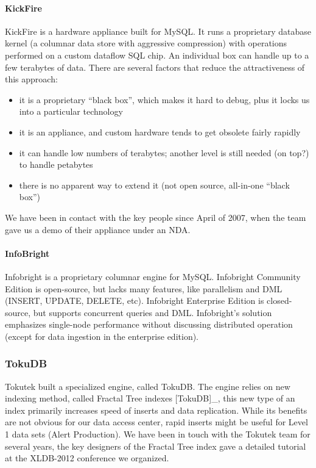 \documentclass[DM,lsstdraft,toc]{lsstdoc}
\begin{document}
\paragraph{KickFire}\label{kickfire}

KickFire is a hardware appliance built for MySQL. It runs a proprietary
database kernel (a columnar data store with aggressive compression) with
operations performed on a custom dataflow SQL chip. An individual box
can handle up to a few terabytes of data. There are several factors that
reduce the attractiveness of this approach:

\begin{itemize}
\item
  it is a proprietary ``black box'', which makes it hard to debug, plus
  it locks us into a particular technology
\item
  it is an appliance, and custom hardware tends to get obsolete fairly
  rapidly
\item
  it can handle low numbers of terabytes; another level is still needed
  (on top?) to handle petabytes
\item
  there is no apparent way to extend it (not open source, all-in-one
  ``black box'')
\end{itemize}

We have been in contact with the key people since April of 2007, when
the team gave us a demo of their appliance under an NDA.

\paragraph{InfoBright}\label{infobright}

Infobright is a proprietary columnar engine for MySQL. Infobright
Community Edition is open-source, but lacks many features, like
parallelism and DML (INSERT, UPDATE, DELETE, etc). Infobright Enterprise
Edition is closed-source, but supports concurrent queries and DML.
Infobright's solution emphasizes single-node performance without
discussing distributed operation (except for data ingestion in the
enterprise edition).

\subsubsection{TokuDB}\label{tokudb}

Tokutek built a specialized engine, called TokuDB. The engine relies on
new indexing method, called Fractal Tree indexes {[}TokuDB{]}\_, this
new type of an index primarily increases speed of inserts and data
replication. While its benefits are not obvious for our data access
center, rapid inserts might be useful for Level 1 data sets (Alert
Production). We have been in touch with the Tokutek team for several
years, the key designers of the Fractal Tree index gave a detailed
tutorial at the XLDB-2012 conference we
organized.
\end{document}
